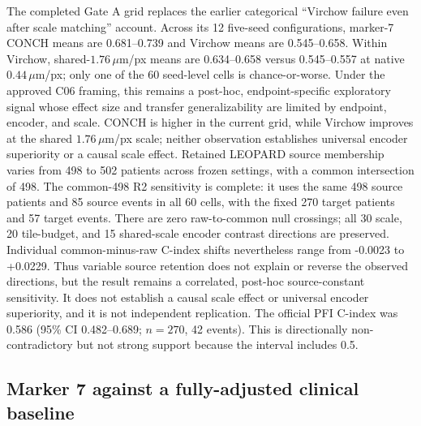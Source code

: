 The completed Gate A grid replaces the earlier categorical ``Virchow failure even after scale
matching'' account. Across its 12 five-seed configurations, marker-7 CONCH means are
0.681--0.739 and Virchow means are 0.545--0.658. Within Virchow, shared-$1.76\,\mu$m/px means
are 0.634--0.658 versus 0.545--0.557 at native $0.44\,\mu$m/px; only one of the 60 seed-level
cells is chance-or-worse. Under the approved C06 framing, this remains a post-hoc,
endpoint-specific exploratory signal whose effect size and transfer generalizability are
limited by endpoint, encoder, and scale. CONCH is higher in the current grid, while Virchow
improves at the shared $1.76\,\mu$m/px scale; neither observation establishes universal encoder
superiority or a causal scale effect. Retained LEOPARD source membership varies from 498 to
502 patients across frozen settings, with a common intersection of 498. The common-498 R2
sensitivity is complete: it uses the same 498 source patients and 85 source events in all 60
cells, with the fixed 270 target patients and 57 target events. There are zero raw-to-common
null crossings; all 30 scale, 20 tile-budget, and 15 shared-scale encoder contrast directions
are preserved. Individual common-minus-raw C-index shifts nevertheless range from -0.0023 to
+0.0229. Thus variable source retention does not explain or reverse the observed directions,
but the result remains a correlated, post-hoc source-constant sensitivity. It does not
establish a causal scale effect or universal encoder superiority, and it is not independent
replication. The official PFI C-index was 0.586 (95\% CI 0.482--0.689; $n=270$, 42 events).
This is directionally non-contradictory but not strong support because the interval includes
0.5.

\subsection{Marker 7 against a fully-adjusted clinical baseline}
\label{sec:res-marker7-clinical}

